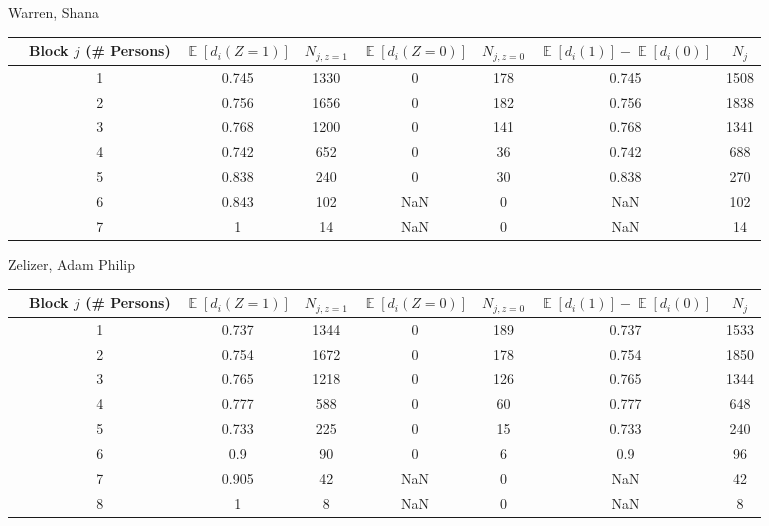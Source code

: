\documentclass[11pt,notitlepage]{article}
\def\E{\mathop{\mathbb{E}}}
\begin{document}
Warren, Shana
\begin{table}[h!]\small
\begin{center}
\begin{tabular}{rc|cc|cc|cc}
  \hline
 & Block $j$ (\# Persons) & $\E[d_i(Z=1)]$ & $N_{j, z=1}$ & $\E[d_i(Z=0)]$ & $N_{j, z=0}$ & $\E[d_i(1)]-\E[d_i(0)]$ & $N_j$ \\ 
  \hline
 & 1 & 0.745 & 1330 & 0 & 178 & 0.745 & 1508 \\ 
 & 2 & 0.756 & 1656 & 0 & 182 & 0.756 & 1838 \\ 
 & 3 & 0.768 & 1200 & 0 & 141 & 0.768 & 1341 \\ 
 & 4 & 0.742 & 652 & 0 & 36 & 0.742 & 688 \\ 
 & 5 & 0.838 & 240 & 0 & 30 & 0.838 & 270 \\ 
 & 6 & 0.843 & 102 & NaN & 0 & NaN & 102 \\ 
 & 7 & 1 & 14 & NaN & 0 & NaN & 14 \\ 
   \hline
\end{tabular}
\end{center}
\end{table}


Zelizer, Adam Philip
\begin{table}[h!]\small
\begin{center}
\begin{tabular}{rc|cc|cc|cc}
  \hline
 & Block $j$ (\# Persons) & $\E[d_i(Z=1)]$ & $N_{j, z=1}$ & $\E[d_i(Z=0)]$ & $N_{j, z=0}$ & $\E[d_i(1)]-\E[d_i(0)]$ & $N_j$ \\ 
  \hline
  & 1 & 0.737 & 1344 & 0 & 189 & 0.737 & 1533 \\ 
  & 2 & 0.754 & 1672 & 0 & 178 & 0.754 & 1850 \\ 
  & 3 & 0.765 & 1218 & 0 & 126 & 0.765 & 1344 \\ 
  & 4 & 0.777 & 588 & 0 & 60 & 0.777 & 648 \\ 
  & 5 & 0.733 & 225 & 0 & 15 & 0.733 & 240 \\ 
  & 6 & 0.9 & 90 & 0 & 6 & 0.9 & 96 \\ 
  & 7 & 0.905 & 42 & NaN & 0 & NaN & 42 \\ 
  & 8 & 1 & 8 & NaN & 0 & NaN & 8 \\ 
   \hline
\end{tabular}
\end{center}
\end{table}
\end{document}

